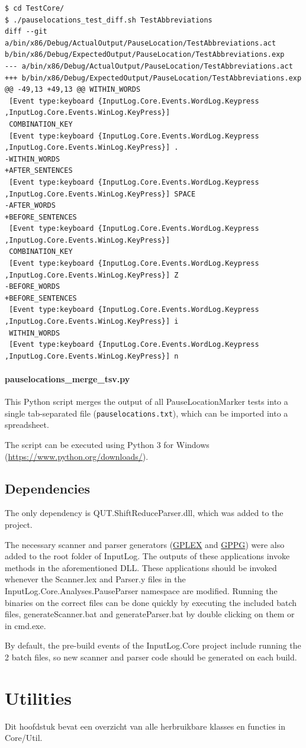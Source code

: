 \documentclass[a4paper,11pt]{report}
\begin{document}
\begin{verbatim}
$ cd TestCore/
$ ./pauselocations_test_diff.sh TestAbbreviations
diff --git a/bin/x86/Debug/ActualOutput/PauseLocation/TestAbbreviations.act b/bin/x86/Debug/ExpectedOutput/PauseLocation/TestAbbreviations.exp
--- a/bin/x86/Debug/ActualOutput/PauseLocation/TestAbbreviations.act
+++ b/bin/x86/Debug/ExpectedOutput/PauseLocation/TestAbbreviations.exp
@@ -49,13 +49,13 @@ WITHIN_WORDS
 [Event type:keyboard {InputLog.Core.Events.WordLog.Keypress ,InputLog.Core.Events.WinLog.KeyPress}] 
 COMBINATION_KEY
 [Event type:keyboard {InputLog.Core.Events.WordLog.Keypress ,InputLog.Core.Events.WinLog.KeyPress}] .
-WITHIN_WORDS
+AFTER_SENTENCES
 [Event type:keyboard {InputLog.Core.Events.WordLog.Keypress ,InputLog.Core.Events.WinLog.KeyPress}] SPACE
-AFTER_WORDS
+BEFORE_SENTENCES
 [Event type:keyboard {InputLog.Core.Events.WordLog.Keypress ,InputLog.Core.Events.WinLog.KeyPress}] 
 COMBINATION_KEY
 [Event type:keyboard {InputLog.Core.Events.WordLog.Keypress ,InputLog.Core.Events.WinLog.KeyPress}] Z
-BEFORE_WORDS
+BEFORE_SENTENCES
 [Event type:keyboard {InputLog.Core.Events.WordLog.Keypress ,InputLog.Core.Events.WinLog.KeyPress}] i
 WITHIN_WORDS
 [Event type:keyboard {InputLog.Core.Events.WordLog.Keypress ,InputLog.Core.Events.WinLog.KeyPress}] n
\end{verbatim}

    \subsubsection{pauselocations\_merge\_tsv.py}
    This Python script merges the output of all PauseLocationMarker tests into a single tab-separated file (\verb|pauselocations.txt|), which can be imported into a spreadsheet.

    The script can be executed using Python 3 for Windows (\url{https://www.python.org/downloads/}).

\section{Dependencies}
The only dependency is QUT.ShiftReduceParser.dll, which was added to the project.


The necessary scanner and parser generators (\href{https://gplex.codeplex.com/}{GPLEX} and \href{https://gppg.codeplex.com/}{GPPG}) were also added to the root folder of InputLog. The outputs of these applications invoke methods in the aforementioned DLL.
These applications should be invoked whenever the Scanner.lex and Parser.y files in the InputLog.Core.Analyses.PauseParser namespace are modified.
Running the binaries on the correct files can be done quickly by executing the included batch files, generateScanner.bat and generateParser.bat by double clicking on them or in cmd.exe.


By default, the pre-build events of the InputLog.Core project include running the 2 batch files, so new scanner and parser code should be generated on each build. 


\chapter{Utilities}
Dit hoofdstuk bevat een overzicht van alle herbruikbare klasses en functies in Core/Util.
\section{}
\end{document}
